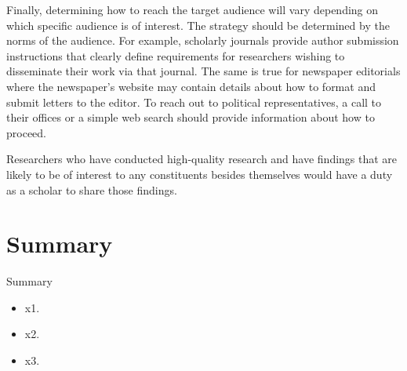 Finally, determining how to reach the target audience will vary depending on which specific audience is of interest. The strategy should be determined by the norms of the audience. For example, scholarly journals provide author submission instructions that clearly define requirements for researchers wishing to disseminate their work via that journal. The same is true for newspaper editorials where the newspaper's website may contain details about how to format and submit letters to the editor. To reach out to political representatives, a call to their offices or a simple web search should provide information about how to proceed.

Researchers who have conducted high-quality research and have findings that are likely to be of interest to any constituents besides themselves would have a duty as a scholar to share those findings. 

\section{Summary}\label{ch15:summary}

\begin{center}
	\begin{tkawybox}{Summary}
		\begin{itemize}
			\setlength{\itemsep}{0pt}
			\setlength{\parskip}{0pt}
			\setlength{\parsep}{0pt}
			
			\item x1.
			\item x2.
			\item x3.
		\end{itemize}
	\end{tkawybox}
\end{center}
